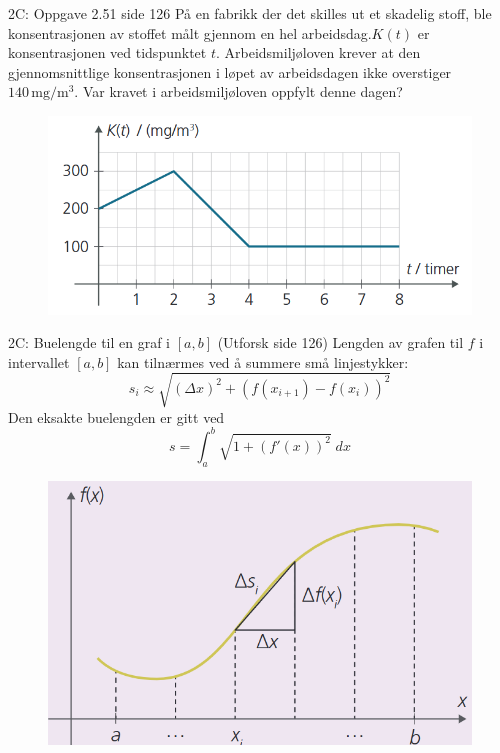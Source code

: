 \greenheader
\begin{frame}{2C: Oppgave 2.51 side 126}
    På en fabrikk der det skilles ut et skadelig stoff, ble konsentrasjonen av stoffet målt gjennom en hel arbeidsdag.\(K(t)\) er konsentrasjonen ved tidspunktet \(t\). Arbeidsmiljøloven krever at den gjennomsnittlige konsentrasjonen i løpet av arbeidsdagen ikke overstiger \(140\,\mathrm{mg}/\mathrm{m}^3\). Var kravet i arbeidsmiljøloven oppfylt denne dagen?

\begin{figure}
    \centering
    \includegraphics[width=0.6\linewidth]{R2-K2B-13.png}
\end{figure}
\end{frame}

\magentaheader
\begin{frame}{2C: Buelengde til en graf i \([a, b]\) (Utforsk side 126)}
Lengden av grafen til \(f\) i intervallet \([a, b]\) kan tilnærmes ved å summere små linjestykker:
\[
s_i \approx \sqrt{(\Delta x)^2 + (f(x_{i+1}) - f(x_i))^2}
\]
Den eksakte buelengden er gitt ved
\[
s = \int_a^b \sqrt{1 + (f'(x))^2} \; dx
\]

    \begin{figure}
        \centering
        \includegraphics[width=0.4\linewidth]{R2-K2C-8.png}
    \end{figure}
\end{frame}



